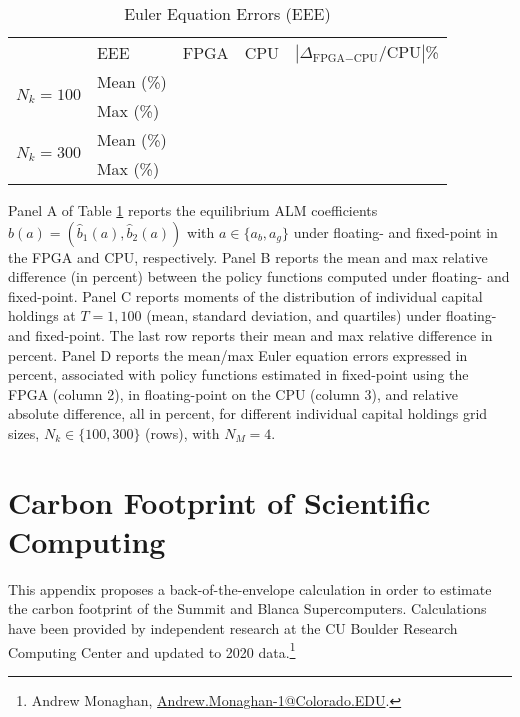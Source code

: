 \documentclass[12pt,american]{article}
\newcommand{\resultsfolder}{./results}
\newcommand{\EEEmeanfpgaIKMIkI}{}
\newcommand{\EEEmeancpuIKMIkI}{}
\newcommand{\EEEmeanrelKMIkI}{}
\newcommand{\EEEmaxfpgaIKMIkI}{}
\newcommand{\EEEmaxcpuIKMIkI}{}
\newcommand{\EEEmaxrelKMIkI}{}
\newcommand{\EEEmeanfpgaIKMIkIII}{}
\newcommand{\EEEmeancpuIKMIkIII}{}
\newcommand{\EEEmeanrelKMIkIII}{}
\newcommand{\EEEmaxfpgaIKMIkIII}{}
\newcommand{\EEEmaxcpuIKMIkIII}{}
\newcommand{\EEEmaxrelKMIkIII}{}
\begin{document}
\begin{table}[htb!]
\begin{center}
\begin{subtable}{\textwidth}
\caption{Euler Equation Errors (EEE)}
\label{tab:EE} 
\begin{tabularx}{\textwidth}{XXXXX}
\toprule
&   EEE   & FPGA & CPU & $|\Delta_{\text{FPGA}-\text{CPU}}/\text{CPU}|$\% \\
\cmidrule{2-5}
\multirow{2}{*}{$N_k=100$} &  Mean (\%)  & \EEEmeanfpgaIKMIkI & \EEEmeancpuIKMIkI & \EEEmeanrelKMIkI\\
&Max (\%)  & \EEEmaxfpgaIKMIkI & \EEEmaxcpuIKMIkI & \EEEmaxrelKMIkI\\
\multirow{2}{*}{$N_k=300$} & Mean (\%)  & \EEEmeanfpgaIKMIkIII & \EEEmeancpuIKMIkIII & \EEEmeanrelKMIkIII\\
&Max (\%)   & \EEEmaxfpgaIKMIkIII & \EEEmaxcpuIKMIkIII & \EEEmaxrelKMIkIII\\      
\bottomrule
\end{tabularx}
\end{subtable}
\end{center}
\label{tab:preana}
\end{table}

Panel A of Table \ref{tab:preana} reports the equilibrium ALM coefficients $\hat{b}(a)=(\hat{b}_1(a),\hat{b}_2(a))$ with $a\in\{a_b,a_g\}$ under floating- and fixed-point in the FPGA and CPU, respectively. Panel B reports the mean and max relative difference (in percent) between the policy functions computed under floating- and fixed-point. Panel C reports moments of the distribution of individual capital holdings at $T=1,100$ (mean, standard deviation, and quartiles) under floating- and fixed-point. The last row reports their mean and max relative difference in percent. Panel D reports the mean/max Euler equation errors expressed in percent, associated with policy functions estimated in fixed-point using the FPGA (column 2), in floating-point on the CPU (column 3), and relative absolute difference, all in percent, for different individual capital holdings grid sizes, $N_k \in\{100,300\}$ (rows), with $N_M=4$.

\section{Carbon Footprint of Scientific Computing}\label{sec:carfot}

This appendix proposes a back-of-the-envelope calculation in order to estimate the carbon footprint of the Summit and Blanca Supercomputers. Calculations have been provided by independent research at the CU Boulder Research Computing Center and updated to 2020 data.\footnote{Andrew Monaghan, \href{mailto:  Andrew.Monaghan-1@Colorado.EDU}{Andrew.Monaghan-1@Colorado.EDU}.} 
\end{document}
